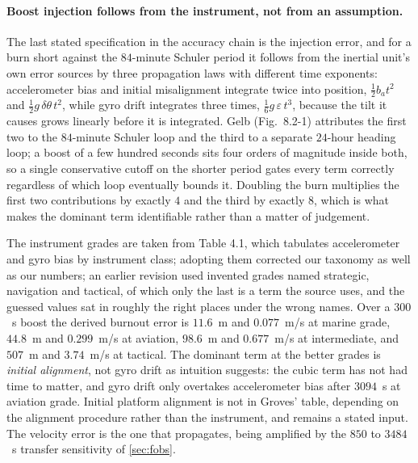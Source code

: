 \documentclass[11pt,a4paper]{article}
\theoremstyle{definition}
\numberwithin{equation}{section}
\begin{document}
\paragraph{Boost injection follows from the instrument, not from an assumption.} The last stated specification in the accuracy chain is the injection error, and for a burn short against the $84$-minute Schuler period it follows from the inertial unit's own error sources by three propagation laws with different time exponents: accelerometer bias and initial misalignment integrate twice into position, $\tfrac12 b_a t^2$ and $\tfrac12 g\,\delta\theta\,t^2$, while gyro drift integrates three times, $\tfrac16 g\,\varepsilon\,t^3$, because the tilt it causes grows linearly before it is integrated. Gelb \cite{gelb1974} (Fig.~8.2-1) attributes the first two to the $84$-minute Schuler loop and the third to a separate $24$-hour heading loop; a boost of a few hundred seconds sits four orders of magnitude inside both, so a single conservative cutoff on the shorter period gates every term correctly regardless of which loop eventually bounds it. Doubling the burn multiplies the first two contributions by exactly $4$ and the third by exactly $8$, which is what makes the dominant term identifiable rather than a matter of judgement.

The instrument grades are taken from \cite{groves2013} Table 4.1, which tabulates accelerometer and gyro bias by instrument class; adopting them corrected our taxonomy as well as our numbers; an earlier revision used invented grades named strategic, navigation and tactical, of which only the last is a term the source uses, and the guessed values sat in roughly the right places under the wrong names. Over a $300$~s boost the derived burnout error is $11.6$~m and $0.077$~m/s at marine grade, $44.8$~m and $0.299$~m/s at aviation, $98.6$~m and $0.677$~m/s at intermediate, and $507$~m and $3.74$~m/s at tactical. The dominant term at the better grades is \emph{initial alignment}, not gyro drift as intuition suggests: the cubic term has not had time to matter, and gyro drift only overtakes accelerometer bias after $3094$~s at aviation grade. Initial platform alignment is not in Groves' table, depending on the alignment procedure rather than the instrument, and remains a stated input. The velocity error is the one that propagates, being amplified by the $850$ to $3484$~s transfer sensitivity of \cref{sec:fobs}.
\end{document}
